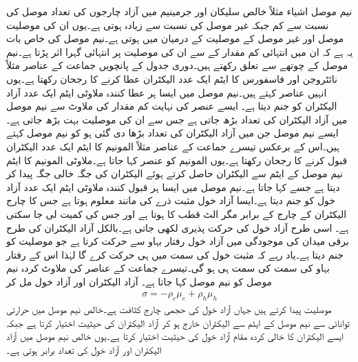 نیم موصل اشیاء مثلاً خالص سلیکان اور جرمینیم میں آزاد چارجوں کی تعداد موصل کی نسبت سے کم جبکہ غیر موصل کی نسبت سے زیادہ ہوتی ہے۔یوں ان کی موصلیت موصل اور غیر موصل کے موصلیت کے درمیان میں ہوتی ہے۔نیم موصل کی خاص بات یہ ہے کہ ان میں انتہائی کم مقدار کے  سے ان کی موصلیت پر انتہائی گہرا اثر پڑتا ہے۔نیم موصل  کے چوتھے   سے تعلق رکھتے ہیں۔دوری جدول کے پانچویں جماعت کے عناصر مثلاً  نائٹروجن اور فاسفورس کا ایٹم ایک عدد الیکٹران عطا کرنے کا رجحان رکھتا ہے۔یوں انہیں  عناصر کہتے ہیں۔نیم موصل میں ایسا ہر عطا کنندہ ملاوٹی ایٹم ایک عدد آزاد الیکٹران کو جنم دیتا ہے۔ ایسے عنصر کی نہایت کم مقدار کی ملاوٹ سے نیم موصل میں آزاد الیکٹران کی تعداد بڑھ جاتی ہے جس سے ان کی موصلیت بہت بڑھ جاتی ہے۔ایسے نیم موصل جن میں آزاد الیکٹران کی تعداد بڑھا دی گئی ہو کو  نیم موصل کہتے ہیں۔اس کے برعکس تیسرے جماعت کے عناصر مثلاً المونیم کا ایٹم ایک عدد الیکٹران قبول کرنے کا رجحان رکھتا ہے۔یوں المونیم کو  عنصر کہا جاتا ہے۔ملاوٹی المونیم کا ایٹم نیم موصل کے ایٹم سے الیکٹران حاصل کرتے ہوئے  الیکٹران کی جگہ خالی جگہ پیدا کر دیتا ہے جسے  کہا جاتا ہے۔نیم موصل میں ایسا ہر قبول کنندہ ملاوٹی ایٹم ایک عدد آزاد خول کو جنم دیتا ہے۔ایسا آزاد خول مثبت ذرے کی مانند معلوم ہوتا ہے جس کا چارج  الیکٹران کے چارج  کے برابر مگر الٹ قطب کا ہوتا ہے اور جس کی کمیت  لی جا سکتی ہے۔ اسی طرح آزاد خول کی حرکت پذیری  لکھی جاتی ہے۔بالکل آزاد الیکٹران کی طرح برقی میدان کی موجودگی میں آزاد خول رفتار بہاو  سے حرکت کرتا ہے جو موصلیت   کو جنم دیتا ہے۔یاد رہے کہ مثبت خول  کی سمت میں ہی حرکت کرے گا لہٰذا اس کے رفتار بہاو کی سمت  کی سمت ہی ہو گی۔تیسرے جماعت کے عناصر کی ملاوٹ کردہ نیم موصل کو  نیم موصل کہا جاتا ہے۔
آزاد الیکٹران اور آزاد خول مل کر 
\begin{align}
\sigma =-\rho_e \mu_e+\rho_h \mu_h
\end{align} 
موصلیت پیدا کرتے ہیں جہاں  آزاد خول کی حجمی چارج کثافت ہے۔خالص نیم موصل میں حرارتی توانائی سے نیم موصل کے ایٹم سے الیکٹران خارج ہو کر آزاد الیکٹران کی حیثیت اختیار کرتا ہے جبکہ ایسے الیکٹران کا خالی کردہ مقام آزاد خول کی حیثیت اختیار کرتا ہے۔یوں خالص نیم موصل میں آزاد الیکٹران اور آزاد خول کی تعداد برابر ہوتی ہے۔

